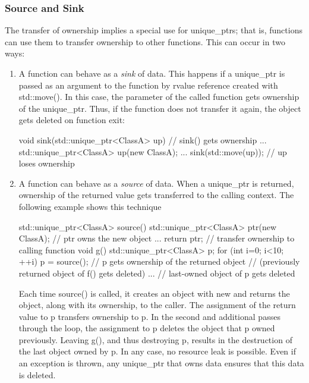 \documentclass{report}
\begin{document}
\subsubsection{Source and Sink}
\bigbreak \noindent 
The transfer of ownership implies a special use for unique\_ptrs; that is, functions can use them to transfer ownership to other functions. This can occur in two ways:
\begin{enumerate}
    \item A function can behave as a \textit{sink} of data. This happens if a unique\_ptr is passed as an argument to the function by rvalue reference created with std::move(). In this case, the parameter of the called function gets ownership of the unique\_ptr. Thus, if the function does not transfer it again, the object gets deleted on function exit:
        \bigbreak \noindent 
        \begin{cppcode}
            void sink(std::unique_ptr<ClassA> up) // sink() gets ownership
            {
                ...
            }
            std::unique_ptr<ClassA> up(new ClassA);
            ...
            sink(std::move(up)); // up loses ownership
        \end{cppcode}
    \item A function can behave as a \textit{source} of data. When a unique\_ptr is returned, ownership of the returned value gets transferred to the calling context. The following example shows this technique
        \bigbreak \noindent 
        \begin{cppcode}
            std::unique_ptr<ClassA> source()
            {
                std::unique_ptr<ClassA> ptr(new ClassA); // ptr owns the new object
                ...
                return ptr; // transfer ownership to calling function
            }
            void g()
            {
                std::unique_ptr<ClassA> p;
                for (int i=0; i<10; ++i) {
                    p = source(); // p gets ownership of the returned object
                    // (previously returned object of f() gets deleted)
                    ...
                }
            } // last-owned object of p gets deleted
        \end{cppcode}
        \bigbreak \noindent 
        Each time source() is called, it creates an object with new and returns the object, along with its ownership, to the caller. The assignment of the return value to p transfers ownership to p. In the second and additional passes through the loop, the assignment to p deletes the object that p owned previously. Leaving g(), and thus destroying p, results in the destruction of the last object owned by p. In any case, no resource leak is possible. Even if an exception is thrown, any unique\_ptr that owns data ensures that this data is deleted.
\end{enumerate}
\end{document}
